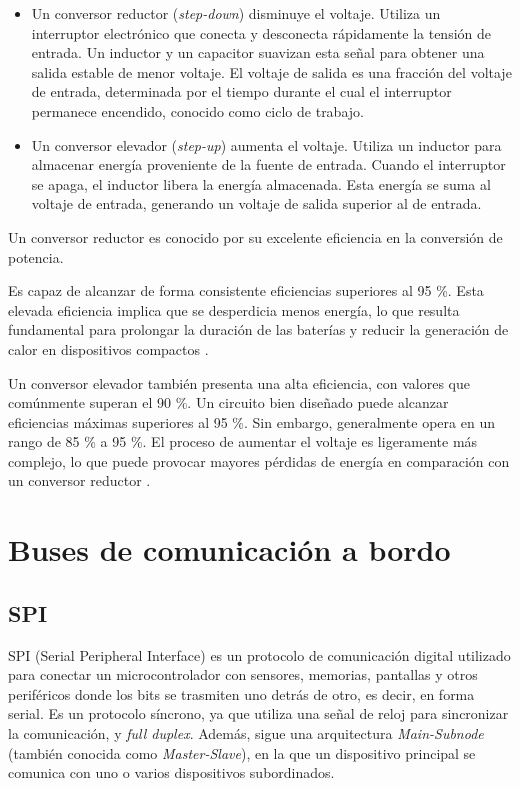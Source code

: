 \documentclass[12pt,a4paper]{article}
\begin{document}
\begin{itemize}
\item
  Un conversor reductor (\textit{step-down}) disminuye el voltaje. Utiliza un interruptor electrónico que conecta y desconecta rápidamente la tensión de entrada. Un inductor y un capacitor suavizan esta señal para obtener una salida estable de menor voltaje. El voltaje de salida es una fracción del voltaje de entrada, determinada por el tiempo durante el cual el interruptor permanece encendido, conocido como ciclo de trabajo.
\item
  Un conversor elevador (\textit{step-up}) aumenta el voltaje. Utiliza un inductor para almacenar energía proveniente de la fuente de entrada. Cuando el interruptor se apaga, el inductor libera la energía almacenada. Esta energía se suma al voltaje de entrada, generando un voltaje de salida superior al de entrada.
\end{itemize}

Un conversor reductor es conocido por su excelente eficiencia en la conversión de potencia.

Es capaz de alcanzar de forma consistente eficiencias superiores al 95 \%. Esta elevada eficiencia implica que se desperdicia menos energía, lo que resulta fundamental para prolongar la duración de las baterías y reducir la generación de calor en dispositivos compactos \cite{ref105}.

Un conversor elevador también presenta una alta eficiencia, con valores que comúnmente superan el 90 \%. Un circuito bien diseñado puede alcanzar eficiencias máximas superiores al 95 \%. Sin embargo, generalmente opera en un rango de 85 \% a 95 \%. El proceso de aumentar el voltaje es ligeramente más complejo, lo que puede provocar mayores pérdidas de energía en comparación con un conversor reductor \cite{ref105}.

\newpage
\section{Buses de comunicación a bordo}\label{interfaces-comunicacion}

\subsection{SPI}\label{spi}

SPI (Serial Peripheral Interface) es un protocolo de comunicación digital utilizado para conectar un microcontrolador con sensores, memorias, pantallas y otros periféricos donde los bits se trasmiten uno detrás de otro, es decir, en forma serial. Es un protocolo síncrono, ya que utiliza una señal de reloj para sincronizar la comunicación, y \textit{full duplex}. Además, sigue una arquitectura \textit{Main-Subnode} (también conocida como \textit{Master-Slave}), en la que un dispositivo principal se comunica con uno o varios dispositivos subordinados.
\end{document}
